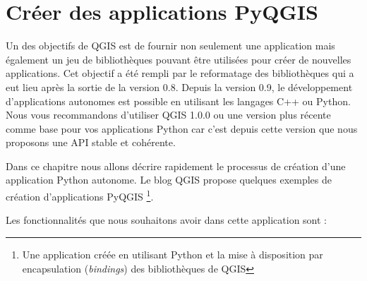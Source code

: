 
\section{Créer des applications PyQGIS}


Un des objectifs de QGIS est de fournir non seulement une application mais également un jeu de bibliothèques pouvant être utilisées pour créer de nouvelles applications. Cet objectif a été rempli par le reformatage des bibliothèques qui a eut lieu après la sortie de la version 0.8. Depuis la version 0.9, le développement d'applications autonomes est possible en utilisant les langages C++ ou Python. Nous vous recommandons d'utiliser QGIS 1.0.0 ou une version plus récente comme base pour vos applications Python car c'est depuis cette version que nous proposons une API stable et cohérente.

Dans ce chapitre nous allons décrire rapidement le processus de création d'une application Python autonome. Le blog QGIS propose quelques exemples de création d'applications PyQGIS \footnote{Une application créée en utilisant Python et la mise à disposition par encapsulation (\textit{bindings}) des bibliothèques de QGIS}.

Les fonctionnalités que nous souhaitons avoir dans cette application sont :


